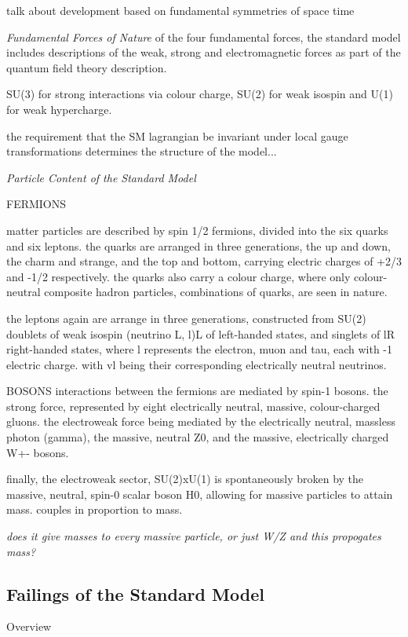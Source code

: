 talk about development
based on fundamental symmetries of space time



\emph{Fundamental Forces of Nature}
of the four fundamental forces, the standard model includes descriptions of the 
weak, strong and electromagnetic forces as part of the quantum field theory 
description.

SU(3) for strong interactions via colour charge, SU(2) for weak isospin and U(1) 
for weak hypercharge.

the requirement that the SM lagrangian be invariant under local gauge 
transformations determines the structure of the model...

\emph{Particle Content of the Standard Model}

FERMIONS

matter particles are described by spin 1/2 fermions, divided into the six quarks and six 
leptons. the quarks are arranged in three generations, the up and down, the charm
and strange, and the top and bottom, carrying electric charges of +2/3 and -1/2 
respectively. the quarks also carry a colour charge, where only colour-neutral 
composite hadron particles, combinations of quarks, are seen in nature.

the leptons again are arrange in three generations, constructed from SU(2) 
doublets of weak isospin (neutrino L, l)L of left-handed states, and singlets of
lR right-handed states, where l represents the electron, muon and tau, each with
-1 electric charge. with vl being their corresponding electrically neutral neutrinos.

BOSONS
interactions between the fermions are mediated by spin-1 bosons. the strong 
force, represented by eight electrically neutral, massive, colour-charged 
gluons. the electroweak force being mediated by the electrically neutral, 
massless photon (gamma), the massive, neutral Z0, and the massive, electrically 
charged W+- bosons.

finally, the electroweak sector, SU(2)xU(1) is spontaneously broken by the 
massive, neutral, spin-0 scalar boson H0, allowing for massive particles to 
attain mass. couples in proportion to mass.

\emph{does it give masses to every massive particle, or just W/Z and this 
propogates mass?}

\subsection{Failings of the Standard Model}
Overview

